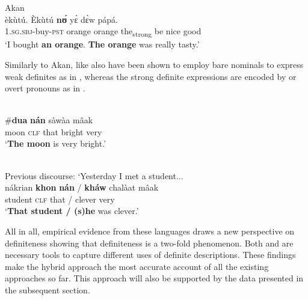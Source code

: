 \documentclass[output=paper,
modfonts
]{langscibook}
\begin{document}
\begin{exe}
	\ex \label{ex:sereikaite:24}
	Akan \citep[2]{ArkohMatthewson2013} \\
	 {èkùtú}. {Èkùtú} {\textbf{n\'{ʊ}}} {y\`{ɛ}} {d\`{ɛ}w}  {pápá}.\\
	\textsc{1.sg.sbj}-buy-\textsc{pst} orange orange the\textsubscript{strong} be nice good\\
	\trans `I bought \textbf{an orange}. \textbf{The orange} was really tasty.'  \\
\end{exe}

Similarly to Akan,  like  also have been shown to employ bare nominals to express weak definites as in , whereas the strong definite expressions are encoded by  or overt pronouns as in  \citep{Jenks2015}.


\begin{exe}
	\ex \label{ex:sereikaite:25} 
	 \citep[106]{Jenks2015} \\
	  {\op}\#\textbf{dua\ng} \textbf{n\'an}{\cp}   {s\`aw\`aa\ng} {m\^aak}\\
	moon  {\phantom{(\#}\textsc{clf}} {that} bright very\\
	\trans `\textbf{The moon} is very bright.' 
\end{exe} 

\begin{exe}
	\ex \label{ex:sereikaite:26}
	 \citep[112]{Jenks2015} \\
	Previous discourse: `Yesterday I met a student...\\
	\gll {\op}nákrian{\cp}  \textbf{khon} \textbf{nán} \textnormal{/} {\op}{\textbf{kháw}}{\cp} {chalàat} {m\^aak}\\
	\phantom{(}student {\textsc{clf}} {that} /  clever very\\
	\trans `\textbf{That student / (s)he} was clever.' 
\end{exe}

All in all, empirical evidence from these languages draws a new perspective on definiteness showing that definiteness is a two-fold phenomenon. Both  and  are necessary tools to capture different uses of definite descriptions. These findings make the hybrid approach the most accurate account of all the existing approaches so far. This approach will also be supported by the  data presented in the subsequent section. 
\end{document}

